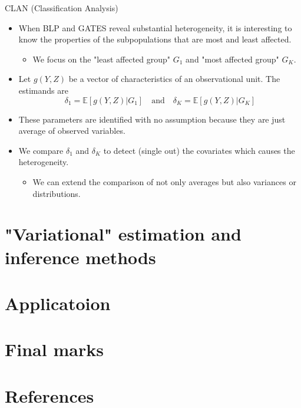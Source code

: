 \documentclass[xcolor=svgnames,aspectratio=169]{beamer}
\newcommand{\E}{\mathbb{E}}
\begin{document}
\begin{frame}{CLAN (Classification Analysis)}
    \begin{itemize}
        \item When BLP and GATES reveal substantial heterogeneity, it is interesting to know \alert{the properties of the subpopulations} that are most and least affected.
        \begin{itemize}
            \item We focus on the "least affected group" $G_1$ and "most affected group" $G_K$.
        \end{itemize}
        \item Let $g(Y,Z)$ be a vector of characteristics of an observational unit. The estimands are 
        \[
        \delta_1=\E[g(Y,Z)|G_1]\quad \text{and}\quad\delta_K=\E[g(Y,Z)|G_K]
        \]
        \item These parameters are identified with no assumption because they are just average of observed variables.
        \item We compare $\delta_1$ and $\delta_K$ to detect (single out) the covariates which causes the heterogeneity.
        \begin{itemize}
            \item We can extend the comparison of not only averages but also variances or distributions.
        \end{itemize}
    \end{itemize}
\end{frame}

\section{"Variational" estimation and inference methods}

\section{Applicatoion}

\section{Final marks}

\section{References}
\end{document}
